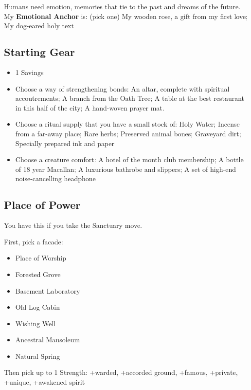 \documentclass[
  oneside,
  statementpaper,
  9pt]{memoir}
\begin{document}
Humans need emotion, memories that tie to the past and dreams of the
future. My \textbf{Emotional Anchor} is: (pick one) My wooden rose, a
gift from my first love; My dog-eared holy text

\hypertarget{starting-gear-4}{%
\subsection{Starting Gear}\label{starting-gear-4}}

\begin{itemize}
\tightlist
\item
  1 Savings
\item
  Choose a way of strengthening bonds: An altar, complete with spiritual
  accoutrements; A branch from the Oath Tree; A table at the best
  restaurant in this half of the city; A hand-woven prayer mat.
\item
  Choose a ritual supply that you have a small stock of: Holy Water;
  Incense from a far-away place; Rare herbs; Preserved animal bones;
  Graveyard dirt; Specially prepared ink and paper
\item
  Choose a creature comfort: A hotel of the month club membership; A
  bottle of 18 year Macallan; A luxurious bathrobe and slippers; A set
  of high-end noise-cancelling headphone
\end{itemize}

\hypertarget{place-of-power-4}{%
\subsection{Place of Power}\label{place-of-power-4}}

You have this if you take the Sanctuary move.

First, pick a facade:

\begin{itemize}
\tightlist
\item
  Place of Worship
\item
  Forested Grove
\item
  Basement Laboratory
\item
  Old Log Cabin
\item
  Wishing Well
\item
  Ancestral Mausoleum
\item
  Natural Spring
\end{itemize}

Then pick up to 1 Strength: +warded, +accorded ground, +famous,
+private, +unique, +awakened spirit
\end{document}

